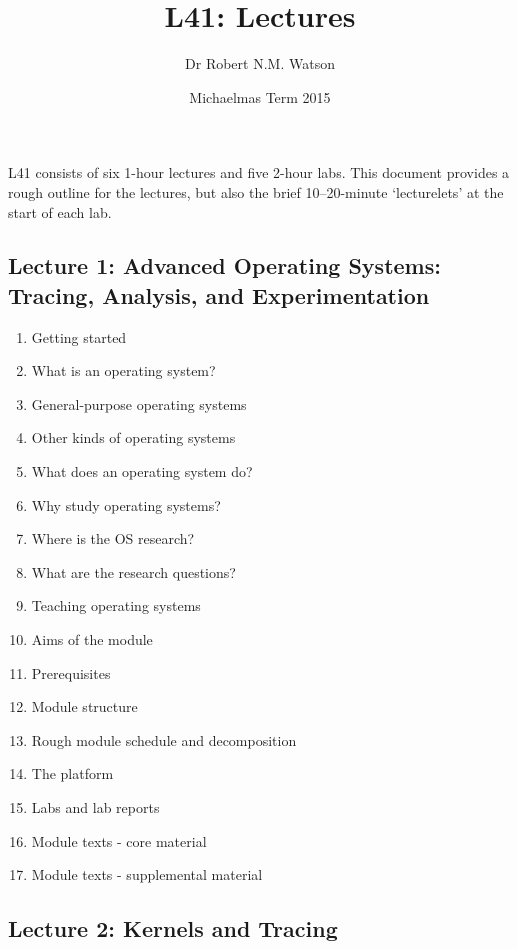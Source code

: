 \documentclass[a4paper,10pt]{article}
\begin{document}
\title{L41: Lectures}
\author{Dr Robert N.M. Watson}
\date{Michaelmas Term 2015}
\maketitle

\noindent
L41 consists of six 1-hour lectures and five 2-hour labs.
This document provides a rough outline for the lectures, but also the brief
10--20-minute `lecturelets' at the start of each lab.

\subsection*{Lecture 1: Advanced Operating Systems: Tracing, Analysis, and
  Experimentation}

\begin{enumerate}
  \item Getting started
  \item What is an operating system?
  \item General-purpose operating systems
  \item Other kinds of operating systems
  \item What does an operating system do?
  \item Why study operating systems?
  \item Where is the OS research?
  \item What are the research questions?
  \item Teaching operating systems
  \item Aims of the module
  \item Prerequisites
  \item Module structure
  \item Rough module schedule and decomposition
  \item The platform
  \item Labs and lab reports
  \item Module texts - core material
  \item Module texts - supplemental material
\end{enumerate}

\subsection*{Lecture 2: Kernels and Tracing}
\end{document}
